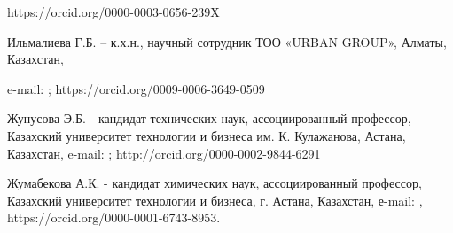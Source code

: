 https://orcid.org/0000-0003-0656-239X

Ильмалиева Г.Б. -- к.х.н., научный сотрудник ТОО «URBAN GROUP», Алматы,
Казахстан,

e-mail:
\href{mailto:g.ilmaliyeva@qazindustry.gov.kz}{};
https://orcid.org/0009-0006-3649-0509

Жунусова Э.Б. - кандидат технических наук, ассоциированный профессор,
Казахский университет технологии и бизнеса им. К. Кулажанова, Астана,
Казахстан, e-mail:
\href{mailto:tahmina.66@mail.ru}{};
http://orcid.org/0000-0002-9844-6291

Жумабекова А.К. - кандидат химических наук, ассоциированный профессор,
Казахский университет технологии и бизнеса, г. Астана, Казахстан,
е-mail:
\href{mailto:zhumabekova_ak@mail.ru}{},
https://orcid.org/0000-0001-6743-8953.\